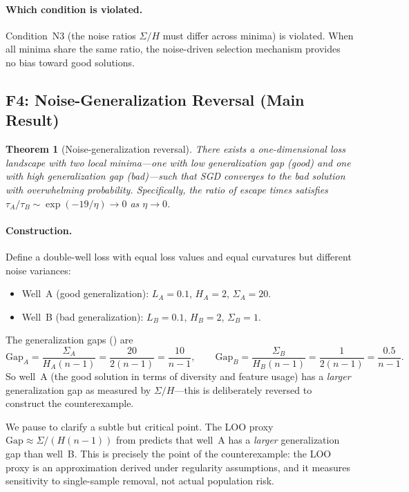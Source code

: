 \documentclass[11pt,a4paper]{article}
\newtheorem{theorem}{Theorem}[section]
\begin{document}
\paragraph{Which condition is violated.}
Condition~N3 (the noise ratios $\Sigma/H$ must differ across minima) is
violated.  When all minima share the same ratio, the noise-driven selection
mechanism provides no bias toward good solutions.

\subsection{F4: Noise-Generalization Reversal (Main Result)}
\label{sec:f4}

\begin{theorem}[Noise-generalization reversal]
\label{thm:f4}
There exists a one-dimensional loss landscape with two local minima---one with
low generalization gap (good) and one with high generalization gap (bad)---such
that SGD converges to the bad solution with overwhelming probability.
Specifically, the ratio of escape times satisfies
$\tau_A / \tau_B \sim \exp(-19/\eta) \to 0$ as $\eta\to 0$.
\end{theorem}

\paragraph{Construction.}
Define a double-well loss with equal loss values and equal curvatures but
different noise variances:
\begin{itemize}[nosep]
  \item Well~A (good generalization): $L_A = 0.1$, $H_A = 2$,
        $\Sigma_A = 20$.
  \item Well~B (bad generalization): $L_B = 0.1$, $H_B = 2$,
        $\Sigma_B = 1$.
\end{itemize}
The generalization gaps () are
\[
  \mathrm{Gap}_A = \frac{\Sigma_A}{H_A(n-1)} = \frac{20}{2(n-1)} = \frac{10}{n-1},
  \qquad
  \mathrm{Gap}_B = \frac{\Sigma_B}{H_B(n-1)} = \frac{1}{2(n-1)} = \frac{0.5}{n-1}.
\]
So well~A (the good solution in terms of diversity and feature usage) has a
\emph{larger} generalization gap as measured by $\Sigma/H$---this is
deliberately reversed to construct the counterexample.

We pause to clarify a subtle but critical point.  The LOO proxy
$\mathrm{Gap} \approx \Sigma/(H(n-1))$ from  predicts that
well~A has a \emph{larger} generalization gap than well~B.  This is precisely
the point of the counterexample: the LOO proxy is an approximation derived
under regularity assumptions, and it measures sensitivity to single-sample
removal, not actual population risk.
\end{document}
